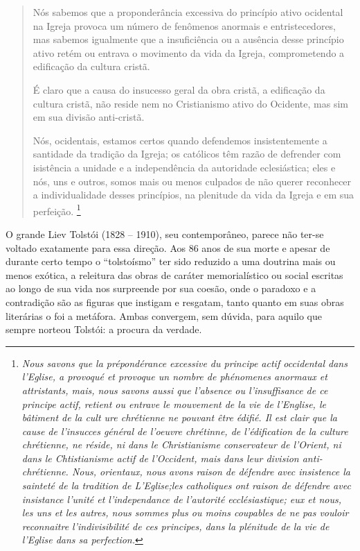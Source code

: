 \begin{quote}
Nós sabemos que a proponderância excessiva do princípio ativo ocidental
na Igreja provoca um número de fenômenos anormais e entristecedores, mas
sabemos igualmente que a insuficiência ou a ausência desse princípio
ativo retém ou entrava o movimento da vida da Igreja, comprometendo a
edificação da cultura cristã.

É claro que a causa do insucesso geral da obra cristã, a edificação da
cultura cristã, não reside nem no Cristianismo ativo do Ocidente, mas
sim em sua divisão anti-cristã.

Nós, ocidentais, estamos certos quando defendemos insistentemente a
santidade da tradição da Igreja; os católicos têm razão de defrender com
isistência a unidade e a independência da autoridade eclesiástica; eles
e nós, uns e outros, somos mais ou menos culpados de não querer
reconhecer a individualidade desses princípios, na plenitude da vida da
Igreja e em sua perfeição. \footnote{\emph{Nous savons que la
  prépondérance excessive du principe actif occidental dans l'Eglise, a
  provoqué et provoque un nombre de phénomenes anormaux et attristants,
  mais, nous savons aussi que l'absence ou l'insuffisance de ce principe
  actif, retient ou entrave le mouvement de la vie de l'Englise, le
  bâtiment de la cult ure chrétienne ne pouvant être édifié. Il est
  clair que la cause de l'insucces général de l'oeuvre chrétinne, de
  l'édification de la culture chrétienne, ne réside, ni dans le
  Christianisme conservateur de l'Orient, ni dans le Chtistianisme actif
  de l'Occident, mais dans leur division anti-chrétienne. Nous,
  orientaux, nous avons raison de défendre avec insistence la sainteté
  de la tradition de L'Eglise;les catholiques ont raison de défendre
  avec insistance l'unité et l'independance de l'autorité
  ecclésiastique; eux et nous, les uns et les autres, nous sommes plus
  ou moins coupables de ne pas vouloir reconnaitre l'indivisibilité de
  ces principes, dans la plénitude de la vie de l'Eglise dans sa
  perfection.}}
\end{quote}

O grande Liev Tolstói (1828 -- 1910), seu contemporâneo, parece não
ter-se voltado exatamente para essa direção. Aos 86 anos de sua morte e
apesar de durante certo tempo o ``tolstoísmo'' ter sido reduzido a uma
doutrina mais ou menos exótica, a releitura das obras de caráter
memorialístico ou social escritas ao longo de sua vida nos surpreende
por sua coesão, onde o paradoxo e a contradição são as figuras que
instigam e resgatam, tanto quanto em suas obras literárias o foi a
metáfora. Ambas convergem, sem dúvida, para aquilo que sempre norteou
Tolstói: a procura da verdade.

